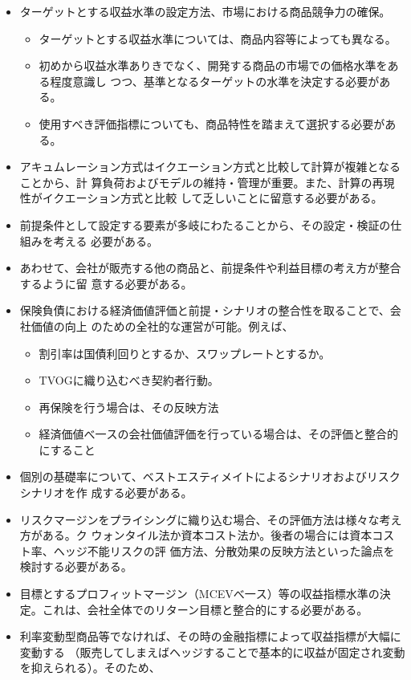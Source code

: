 \documentclass[report,gutter=10mm,fore-edge=10mm,uplatex,dvipdfmx]{jlreq}
\begin{document}
\begin{itemize}
 \item ターゲットとする収益水準の設定方法、市場における商品競争力の確保。
\begin{itemize}
 \item ターゲットとする収益水準については、商品内容等によっても異なる。
 \item 初めから収益水準ありきでなく、開発する商品の市場での価格水準をある程度意識し
つつ、基準となるターゲットの水準を決定する必要がある。
 \item 使用すべき評価指標についても、商品特性を踏まえて選択する必要がある。
\end{itemize}
 \item アキュムレーション方式はイクエーション方式と比較して計算が複雑となることから、計
算負荷およびモデルの維持・管理が重要。また、計算の再現性がイクエーション方式と比較
して乏しいことに留意する必要がある。
 \item 前提条件として設定する要素が多岐にわたることから、その設定・検証の仕組みを考える
必要がある。
 \item あわせて、会社が販売する他の商品と、前提条件や利益目標の考え方が整合するように留
意する必要がある。
 \item 保険負債における経済価値評価と前提・シナリオの整合性を取ることで、会社価値の向上
のための全社的な運営が可能。例えば、
\begin{itemize}
 \item  割引率は国債利回りとするか、スワップレートとするか。
 \item TVOGに織り込むべき契約者行動。
 \item 再保険を行う場合は、その反映方法
 \item 経済価値べ一スの会社価値評価を行っている場合は、その評価と整合的にすること
\end{itemize}
 \item 個別の基礎率について、ベストエスティメイトによるシナリオおよびリスクシナリオを作
成する必要がある。
 \item リスクマージンをプライシングに織り込む場合、その評価方法は様々な考え方がある。ク
ウォンタイル法か資本コスト法か。後者の場合には資本コスト率、ヘッジ不能リスクの評
価方法、分散効果の反映方法といった論点を検討する必要がある。
 \item 目標とするプロフィットマージン（MCEVべ一ス）等の収益指標水準の決定。これは、会社全体でのリターン目標と整合的にする必要がある。
 \item 利率変動型商品等でなければ、その時の金融指標によって収益指標が大幅に変動する
（販売してしまえばヘッジすることで基本的に収益が固定され変動を抑えられる）。そのため、

\end{itemize}
\end{document}
